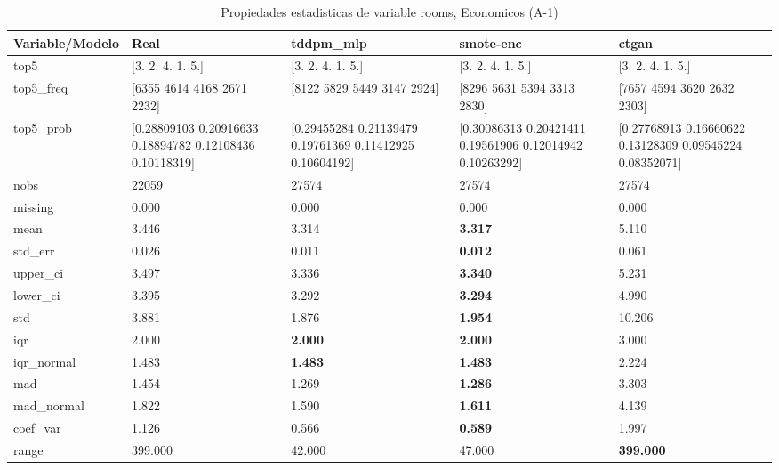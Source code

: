 \begin{table}[H]
\centering
\fontsize{8}{14}\selectfont
\caption{Propiedades  estadisticas de variable rooms, Economicos (A-1)}
\label{table-stats-economicos-a-1-rooms}
\begin{tabular}{|l|m{10em}|m{10em}|m{10em}|m{10em}|}
\hline
 \rowcolor[gray]{0.8}
Variable/Modelo & Real & tddpm\_mlp & smote-enc & ctgan \\
\hline top5 & [3. 2. 4. 1. 5.] & [3. 2. 4. 1. 5.] & [3. 2. 4. 1. 5.] & [3. 2. 4. 1. 5.] \\
\hline top5\_freq & [6355 4614 4168 2671 2232] & [8122 5829 5449 3147 2924] & [8296 5631 5394 3313 2830] & [7657 4594 3620 2632 2303] \\
\hline top5\_prob & [0.28809103 0.20916633 0.18894782 0.12108436 0.10118319] & [0.29455284 0.21139479 0.19761369 0.11412925 0.10604192] & [0.30086313 0.20421411 0.19561906 0.12014942 0.10263292] & [0.27768913 0.16660622 0.13128309 0.09545224 0.08352071] \\
\hline nobs & 22059 & 27574 & 27574 & 27574 \\
\hline missing & 0.000 & 0.000 & 0.000 & 0.000 \\
\hline mean & 3.446 & 3.314 & \bfseries 3.317 & \cellcolor[rgb]{0.9, 0.54, 0.52} 5.110 \\
\hline std\_err & 0.026 & 0.011 & \bfseries 0.012 & \cellcolor[rgb]{0.9, 0.54, 0.52} 0.061 \\
\hline upper\_ci & 3.497 & 3.336 & \bfseries 3.340 & \cellcolor[rgb]{0.9, 0.54, 0.52} 5.231 \\
\hline lower\_ci & 3.395 & 3.292 & \bfseries 3.294 & \cellcolor[rgb]{0.9, 0.54, 0.52} 4.990 \\
\hline std & 3.881 & 1.876 & \bfseries 1.954 & \cellcolor[rgb]{0.9, 0.54, 0.52} 10.206 \\
\hline iqr & 2.000 & \bfseries 2.000 & \bfseries 2.000 & \cellcolor[rgb]{0.9, 0.54, 0.52} 3.000 \\
\hline iqr\_normal & 1.483 & \bfseries 1.483 & \bfseries 1.483 & \cellcolor[rgb]{0.9, 0.54, 0.52} 2.224 \\
\hline mad & 1.454 & 1.269 & \bfseries 1.286 & \cellcolor[rgb]{0.9, 0.54, 0.52} 3.303 \\
\hline mad\_normal & 1.822 & 1.590 & \bfseries 1.611 & \cellcolor[rgb]{0.9, 0.54, 0.52} 4.139 \\
\hline coef\_var & 1.126 & 0.566 & \bfseries 0.589 & \cellcolor[rgb]{0.9, 0.54, 0.52} 1.997 \\
\hline range & 399.000 & \cellcolor[rgb]{0.9, 0.54, 0.52} 42.000 & 47.000 & \bfseries 399.000 \\

\end{tabular}
\end{table}
